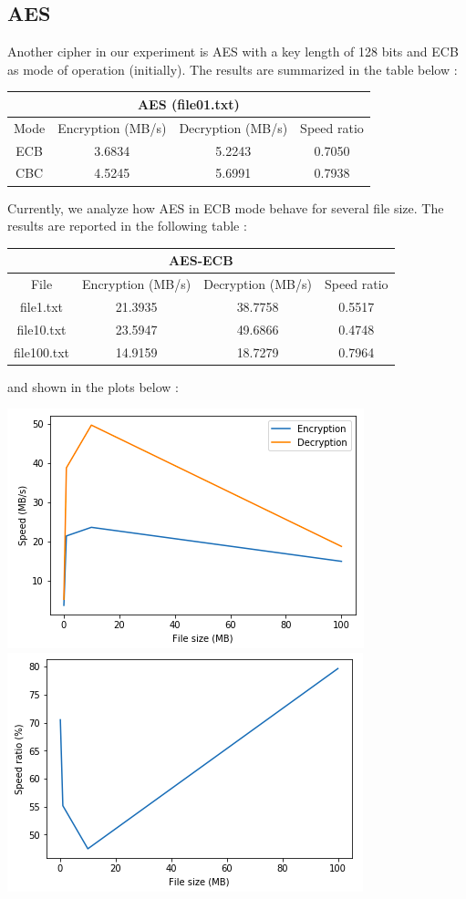 \documentclass[11pt]{article}
\begin{document}
\subsection{AES}
Another cipher in our experiment is AES with a key length of 128 bits and ECB as mode of operation (initially). The results are summarized in the table below :
\begin{center}
\begin{tabular}{| c | c | c | c |}
\hline
\multicolumn{4}{|c|}{AES (file01.txt)} \\
\hline
Mode & Encryption (MB/s) & Decryption (MB/s) & Speed ratio\\
\hline
ECB & 3.6834 & 5.2243 & 0.7050 \\
\hline
CBC & 4.5245 & 5.6991 & 0.7938 \\
\hline
\end{tabular}
\end{center}
Currently, we analyze how AES in ECB mode behave for several file size. The results are reported in the following table :
\begin{center}
\begin{tabular}{| c | c | c | c |}
\hline
\multicolumn{4}{|c|}{AES-ECB} \\
\hline
File & Encryption (MB/s) & Decryption (MB/s) & Speed ratio\\
\hline
file1.txt & 21.3935 & 38.7758 & 0.5517 \\
\hline
file10.txt & 23.5947 & 49.6866 & 0.4748\\
\hline
file100.txt & 14.9159 & 18.7279 & 0.7964 \\
\hline
\end{tabular}
\end{center}
and shown in the plots below :
\begin{center}
\includegraphics[scale=0.45]{./enc_dec_speed_aes_ecb.png}
\includegraphics[scale=0.45]{./avg_speed_ratio_aes_ecb.png}
\end{center}
\end{document}
